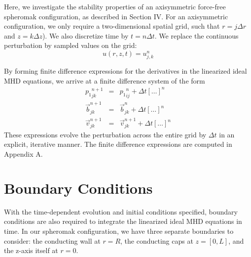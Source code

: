 \documentclass[%
 reprint,
 amsmath,amssymb,
 aps,
]{revtex4-2}
\begin{document}
Here, we investigate the stability properties of an axisymmetric force-free spheromak configuration, as described in Section IV. For an axisymmetric configuration, we only require a two-dimensional spatial grid, such that $r = j \Delta r$ and $z = k \Delta z$). We also discretize time by $t = n \Delta t$. We replace the continuous perturbation by sampled values on the grid:
\begin{equation}
u(r, z, t) = u_{j, k} ^{n}
\end{equation}

By forming finite difference expressions for the derivatives in the linearized ideal MHD equations, we arrive at a finite difference system of the form
\begin{eqnarray}
{p_1}_{jk} ^{n+1} &=& {p_1}_{ij} ^n + \Delta t \left[ \ldots \right]^n \\
{\vec b}_{jk} ^{n+1} & = & {\vec{b}}_{jk} ^n + \Delta t [ \ldots ] ^n \\
{\vec v} _{jk} ^{n+1} & = & {\vec v}_{jk} ^{n+1} + \Delta t [\ldots ]^n
\end{eqnarray}
These expressions evolve the perturbation across the entire grid by $\Delta t$ in an explicit, iterative manner. The finite difference expressions are computed in Appendix A.

\section{Boundary Conditions}

With the time-dependent evolution and initial conditions specified, boundary conditions are also required to integrate the linearized ideal MHD equations in time. In our spheromak configuration, we have three separate boundaries to consider: the conducting wall at $r=R$, the conducting caps at $z=[0, L]$, and the z-axis itself at $r=0$.
\end{document}
